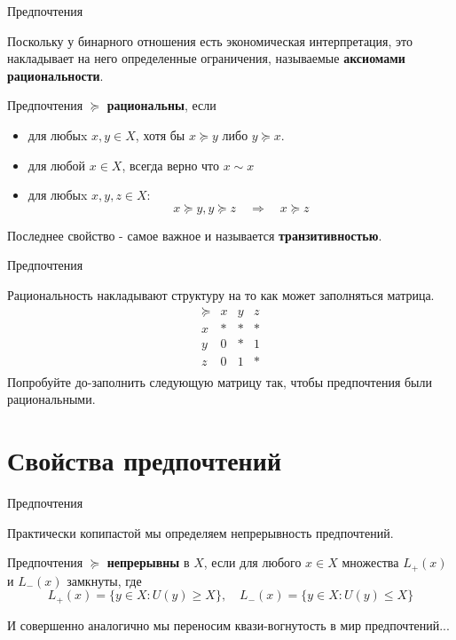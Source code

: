 \documentclass{beamer}
\begin{document}
\begin{frame}{Предпочтения}

Поскольку у бинарного отношения есть экономическая интерпретация, это накладывает на него определенные ограничения, называемые \textbf{аксиомами рациональности}.

\begin{definition}
Предпочтения $\succcurlyeq$	\textbf{рациональны}, если
\begin{itemize}
\item для любыx $x, y \in X$, хотя бы $x \succcurlyeq y$ либо $y \succcurlyeq x$.
\item для любой $x \in X$, всегда верно что $x \sim x$
\item для любыx $x, y, z \in X$: 
$$x \succcurlyeq y, y \succcurlyeq z \quad \Rightarrow \quad x \succcurlyeq z$$
\end{itemize}
\end{definition}
Последнее свойство - самое важное и называется \textbf{транзитивностью}. 

\end{frame}

\begin{frame}{Предпочтения}

Рациональность накладывают структуру на то как может заполняться матрица. 
$$ 
\begin{array}{c|ccc}
 \succcurlyeq & x & y & z\\
\hline
x & * & * & * \\
y & 0 & * & 1\\
z & 0 & 1 & *\\
\end{array}
$$
Попробуйте до-заполнить следующую матрицу так, чтобы предпочтения были рациональными.

\end{frame}

\section{Свойства предпочтений}

\begin{frame}{Предпочтения}

Практически копипастой мы определяем непрерывность предпочтений.

\begin{definition}
Предпочтения $\succcurlyeq$ \textbf{непрерывны} в $X$, если для любого $x \in X$ множества $L_{+}(x)$ и $L_{-}(x)$ замкнуты, где
$$L_{+}(x) = \{y \in X: U(y) \geqslant X\}, \quad L_{-}(x) = \{y \in X: U(y) \leqslant X\}$$
\end{definition}

И совершенно аналогично мы переносим квази-вогнутость в мир предпочтений...

\end{frame}
\end{document}
